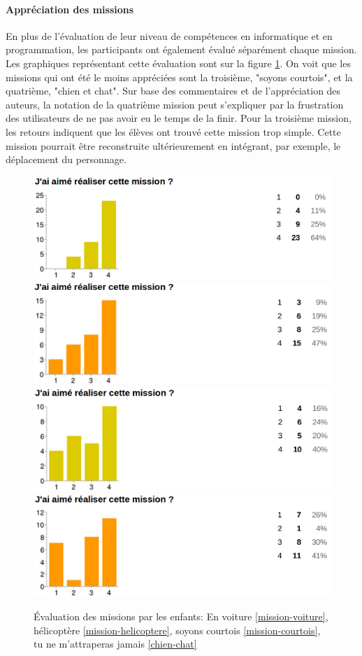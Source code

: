 \paragraph{Appréciation des missions}
\label{appreciation}
En plus de l'évaluation de leur niveau de compétences en informatique et en programmation, les participants ont également évalué séparément chaque mission. Les graphiques représentant cette évaluation sont sur la figure \ref{fig:evaluation-mission}. On voit que les missions qui ont été le moins appréciées sont la troisième, "soyons courtois", et la quatrième, "chien et chat".
Sur base des commentaires et de l'appréciation des auteurs, la notation de la quatrième mission peut s'expliquer par la frustration des utilisateurs de ne pas avoir eu le temps de la finir.
Pour la troisième mission, les retours indiquent que les élèves ont trouvé cette mission trop simple. Cette mission pourrait être reconstruite ultérieurement en intégrant, par exemple, le déplacement du personnage.\\


\begin{figure}[ht]
  \begin{center}
    \includegraphics[width=.7\textwidth]{content/8-validation/images/voiture}
    \includegraphics[width=.7\textwidth]{content/8-validation/images/helico}
    \includegraphics[width=.7\textwidth]{content/8-validation/images/courtois}
    \includegraphics[width=.7\textwidth]{content/8-validation/images/chien}
    \caption{Évaluation des missions par les enfants: En voiture \ref{mission-voiture}, hélicoptère \ref{mission-helicoptere}, soyons courtois \ref{mission-courtois}, tu ne m'attraperas jamais \ref{chien-chat}}
    \label{fig:evaluation-mission}
  \end{center}
\end{figure}


